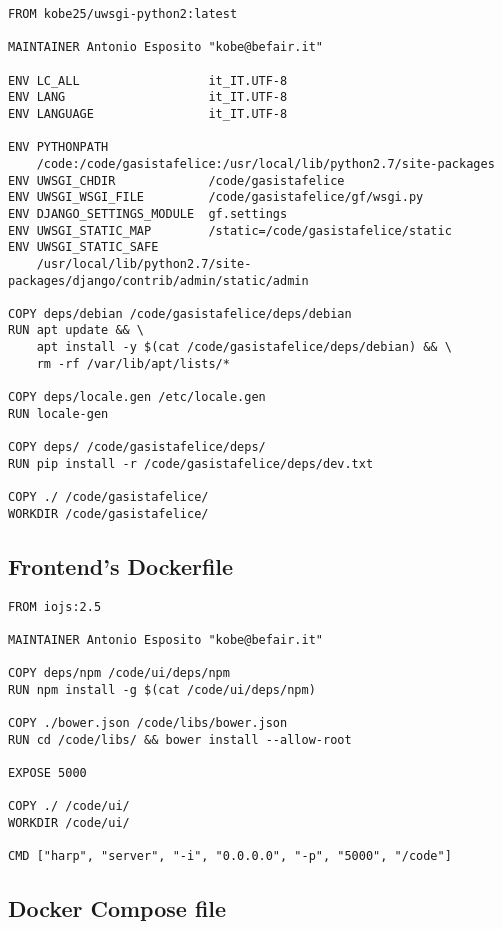 \begin{verbatim}
FROM kobe25/uwsgi-python2:latest

MAINTAINER Antonio Esposito "kobe@befair.it"

ENV LC_ALL                  it_IT.UTF-8
ENV LANG                    it_IT.UTF-8
ENV LANGUAGE                it_IT.UTF-8

ENV PYTHONPATH
    /code:/code/gasistafelice:/usr/local/lib/python2.7/site-packages
ENV UWSGI_CHDIR             /code/gasistafelice
ENV UWSGI_WSGI_FILE         /code/gasistafelice/gf/wsgi.py
ENV DJANGO_SETTINGS_MODULE  gf.settings
ENV UWSGI_STATIC_MAP        /static=/code/gasistafelice/static
ENV UWSGI_STATIC_SAFE
    /usr/local/lib/python2.7/site-packages/django/contrib/admin/static/admin

COPY deps/debian /code/gasistafelice/deps/debian
RUN apt update && \
    apt install -y $(cat /code/gasistafelice/deps/debian) && \
    rm -rf /var/lib/apt/lists/*

COPY deps/locale.gen /etc/locale.gen
RUN locale-gen

COPY deps/ /code/gasistafelice/deps/
RUN pip install -r /code/gasistafelice/deps/dev.txt

COPY ./ /code/gasistafelice/
WORKDIR /code/gasistafelice/
\end{verbatim}

\subsection{Frontend's Dockerfile}\label{frontends-dockerfile}

\begin{verbatim}
FROM iojs:2.5

MAINTAINER Antonio Esposito "kobe@befair.it"

COPY deps/npm /code/ui/deps/npm
RUN npm install -g $(cat /code/ui/deps/npm)

COPY ./bower.json /code/libs/bower.json
RUN cd /code/libs/ && bower install --allow-root

EXPOSE 5000

COPY ./ /code/ui/
WORKDIR /code/ui/

CMD ["harp", "server", "-i", "0.0.0.0", "-p", "5000", "/code"]
\end{verbatim}

\subsection{Docker Compose file}\label{docker-compose-file}

